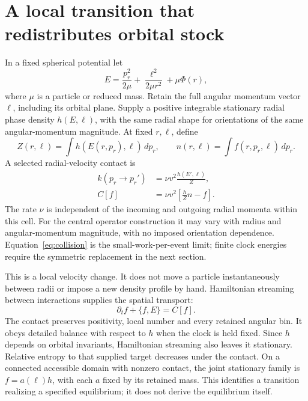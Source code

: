 \documentclass[11pt]{article}
\begin{document}
\section{A local transition that redistributes orbital stock}
In a fixed spherical potential let
\begin{equation}
 E=\frac{p_r^2}{2\mu}+\frac{\ell^2}{2\mu r^2}+\mu\Phi(r),
\end{equation}
where $\mu$ is a particle or reduced mass. Retain the full angular momentum
vector $\boldsymbol\ell$, including its orbital plane. Supply a positive
integrable stationary radial phase density $h(E,\ell)$, with the same radial
shape for orientations of the same angular-momentum magnitude. At fixed
$r,\boldsymbol\ell$, define
\begin{equation}
 Z(r,\ell)=\int h(E(r,p_r),\ell)\,dp_r,
 \qquad n(r,\boldsymbol\ell)=\int f(r,p_r,\boldsymbol\ell)\,dp_r.
\end{equation}
A selected radial-velocity contact is
\begin{align}
 k(p_r\to p_r')&=\nu v^2\frac{h(E',\ell)}{Z},\label{eq:rate}\\
 C[f]&=\nu v^2\left[\frac{h}{Z}n-f\right].\label{eq:collision}
\end{align}
The rate $\nu$ is independent of the incoming and outgoing radial momenta
within this cell. For the central operator construction it may vary with
radius and angular-momentum magnitude, with no imposed orientation dependence.
Equation~\eqref{eq:collision} is the small-work-per-event limit; finite
clock energies require the symmetric replacement in the next section.

This is a local velocity change. It does not move a particle instantaneously
between radii or impose a new density profile by hand. Hamiltonian streaming
between interactions supplies the spatial transport:
\begin{equation}\label{eq:kinetic}
 \partial_t f+\{f,E\}=C[f].
\end{equation}
The contact preserves positivity, local number and every retained angular
bin. It obeys detailed balance with respect to $h$ when the clock is held
fixed. Since $h$ depends on orbital invariants, Hamiltonian streaming also
leaves it stationary. Relative entropy to that supplied target decreases
under the contact. On a connected accessible domain with nonzero contact,
the joint stationary family is $f=a(\boldsymbol\ell)h$, with each
$a$ fixed by its retained mass. This identifies a transition realizing a
specified equilibrium; it does not derive the equilibrium itself.
\end{document}
